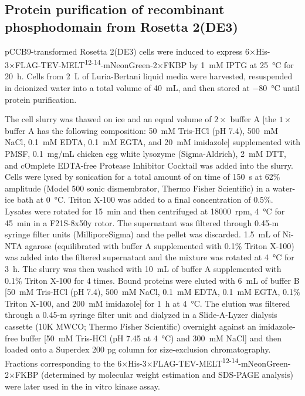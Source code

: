 \subsection{Protein purification of recombinant  phosphodomain from Rosetta\texttrademark{} 2(DE3)}

pCCB9-transformed Rosetta\texttrademark{} 2(DE3) cells were induced to express 6×His-3×FLAG-TEV-MELT\textsuperscript{12-14}-mNeonGreen-2×FKBP by \SI{1}{mM} IPTG at \SI{25}{\celsius} for \SI{20}{h}. Cells from \SI{2}{L} of Luria-Bertani liquid media were harvested, resuspended in deionized water into a total volume of \SI{40}{mL}, and then stored at \SI{-80}{\celsius} until protein purification.

The cell slurry was thawed on ice and an equal volume of $2\times$ buffer A [the $1\times$ buffer A has the following composition: \SI{50}{mM} Tris-HCl (pH 7.4), \SI{500}{mM} NaCl, \SI{0.1}{mM} EDTA, \SI{0.1}{mM} EGTA, and \SI{20}{mM} imidazole] supplemented with PMSF, \SI{0.1}{mg/mL} chicken egg white lysozyme (Sigma-Aldrich), \SI{2}{mM} DTT, and cOmplete\texttrademark{} EDTA-free Protease Inhibitor Cocktail was added into the slurry. Cells were lysed by sonication for a total amount of on time of \SI{150}{s} at 62\% amplitude (Model 500 sonic dismembrator, Thermo Fisher Scientific) in a water-ice bath at \SI{0}{\celsius}. Triton X-100 was added to a final concentration of 0.5\%. Lysates were rotated for \SI{15}{min} and then centrifuged at \SI{18000}{rpm}, \SI{4}{\celsius} for \SI{45}{min} in a F21S-8x50y rotor. The supernatant was filtered through 0.45-\textmu{}m syringe filter units (MilliporeSigma) and the pellet was discarded. \SI{1.5}{mL} of Ni-NTA agarose (equilibrated with buffer A supplemented with 0.1\% Triton X-100) was added into the filtered supernatant and the mixture was rotated at \SI{4}{\celsius} for \SI{3}{h}. The slurry was then washed with \SI{10}{mL} of buffer A supplemented with 0.1\% Triton X-100 for 4 times. Bound proteins were eluted with \SI{6}{mL} of buffer B [\SI{50}{mM} Tris-HCl (pH 7.4), \SI{500}{mM} NaCl, \SI{0.1}{mM} EDTA, \SI{0.1}{mM} EGTA, 0.1\% Triton X-100, and \SI{200}{mM} imidazole] for \SI{1}{h} at \SI{4}{\celsius}. The elution was filtered through a 0.45-\textmu{}m syringe filter unit and dialyzed in a Slide-A-Lyzer\texttrademark{} dialysis cassette (10K MWCO; Thermo Fisher Scientific) overnight against an imidazole-free buffer [\SI{50}{mM} Tris-HCl (pH 7.45 at \SI{4}{\celsius}) and \SI{300}{mM} NaCl] and then loaded onto a Superdex 200 pg column for size-exclusion chromatography. Fractions corresponding to the 6×His-3×FLAG-TEV-MELT\textsuperscript{12-14}-mNeonGreen-2×FKBP (determined by molecular weight estimation and SDS-PAGE analysis) were later used in the in vitro kinase assay.

